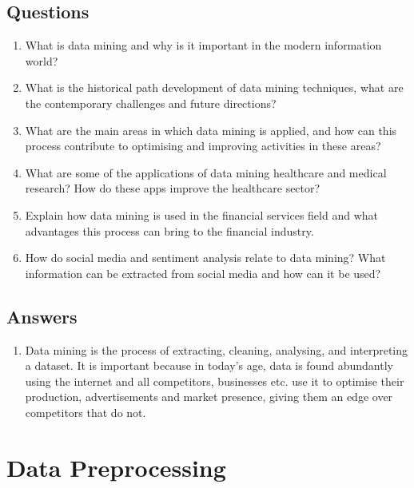 \documentclass[a4paper, 12pt]{article}
\theoremstyle{plain}
\theoremstyle{definition}
\theoremstyle{remark}
\begin{document}
\subsection{Questions}
\begin{enumerate}
	\item What is data mining and why is it important in the modern information world?
	\item What is the historical path development of data mining techniques, what are the contemporary challenges and future directions?
	\item What are the main areas in which data mining is applied, and how can this process contribute to optimising and improving activities in these areas?
	\item What are some of the applications of data mining healthcare and medical research? How do these apps improve the healthcare sector?
	\item Explain how data mining is used in the financial services field and what advantages this process can bring to the financial industry.
	\item How do social media and sentiment analysis relate to data mining? What information can be extracted from social media and how can it be used?
\end{enumerate}
\subsection{Answers}
\begin{enumerate}
	\item Data mining is the process of extracting, cleaning, analysing, and interpreting a dataset. It is important because in today's age, data is found abundantly using the internet and all competitors, businesses etc. use it to optimise their production, advertisements and market presence, giving them an edge over competitors that do not.
\end{enumerate}
\newpage
\section{Data Preprocessing}
\end{document}
